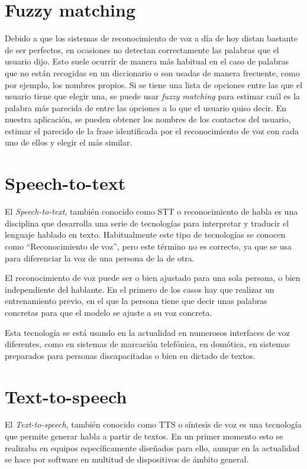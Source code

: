 \section{Fuzzy matching}
Debido a que los sistemas de reconocimiento de voz a día de hoy distan bastante de ser perfectos, en ocasiones no detectan correctamente las palabras que el usuario dijo. Esto suele ocurrir de manera más habitual en el caso de palabras que no están recogidas en un diccionario o son usadas de manera frecuente, como por ejemplo, los nombres propios. Si se tiene una lista de opciones entre las que el usuario tiene que elegir una, se puede usar \textit{fuzzy matching} \cite{fuzzymatching} para estimar cuál es la palabra más parecida de entre las opciones a lo que el usuario quiso decir. En nuestra aplicación, se pueden obtener los nombres de los contactos del usuario, estimar el parecido de la frase identificada por el reconocimiento de voz con cada uno de ellos y elegir el más similar.

\section{Speech-to-text}
El \textit{Speech-to-text}, también conocido como STT o reconocimiento de habla \cite{stt} es una disciplina que desarrolla una serie de tecnologías para interpretar y traducir el lenguaje hablado en texto. Habitualmente este tipo de tecnologías se conocen como ``Reconocimiento de voz'', pero este término no es correcto, ya que se usa para diferenciar la voz de una persona de la de otra.

El reconocimiento de voz puede ser o bien ajustado para una sola persona, o bien independiente del hablante. En el primero de los casos hay que realizar un entrenamiento previo, en el que la persona tiene que decir unas palabras concretas para que el modelo se ajuste a su voz concreta.

Esta tecnología se está usando en la actualidad en numerosos interfaces de voz diferentes, como en sistemas de marcación telefónica, en domótica, en sistemas preparados para personas discapacitadas o bien en dictado de textos.

\section{Text-to-speech}
El \textit{Text-to-speech}, también conocido como TTS o síntesis de voz \cite{tts} es una tecnología que permite generar habla a partir de textos. En un primer momento esto se realizaba en equipos específicamente diseñados para ello, aunque en la actualidad se hace por software en multitud de dispositivos de ámbito general.

